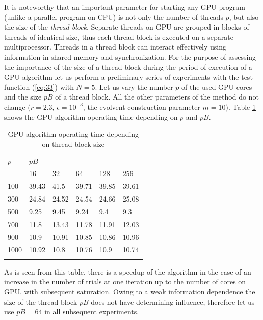 \documentclass[smallcondensed]{svjour3}     %
\begin{document}
It is noteworthy that an important parameter for starting any GPU program (unlike a parallel program on CPU) is not only the number of threads $p$, but also the size of the \textit{thread block}. Separate threads on GPU are grouped in blocks of threads of identical size, thus each thread block is executed on a separate multiprocessor. Threads in a thread block can interact effectively using information in shared memory and synchronization. For the purpose of assessing the importance of the size of a thread block during the period of execution of a GPU algorithm let us perform a preliminary series of experiments with the test function (\ref{eq:33}) with $N=5$. Let us vary the number $p$ of the used GPU cores and the size $pB$ of a thread block. All the other parameters of the method do not change ($r=2.3$, $\epsilon = 10^{-3}$, the evolvent construction parameter $m=10$). Table \ref{tab:2} shows the GPU algorithm operating time depending on $p$ and $pB$.
\begin{table}
	\caption{GPU algorithm operating time depending on thread block size}
	\label{tab:2}
	\center
	\begin{tabular}{llllll}
		\hline\noalign{\smallskip}
		$p$ & \multicolumn{5}{l}{ \hfil $pB$ \hfil } \\
		\noalign{\smallskip} \cline{2-6} \noalign{\smallskip}
		 & 16 & 32 & 64 & 128 & 256  \\
		\noalign{\smallskip} \hline \noalign{\smallskip}
		100 &	39.43 &	41.5 &	39.71 &	39.85 &	39.61 \\
		300 &	24.84 &	24.52 &	24.54 &	24.66 &	25.08 \\
		500 &	9.25 &	9.45 &	9.24 &	9.4 &	9.3\\
		700 &	11.8 &	13.43 &	11.78 &	11.91 &	12.03\\
		900 &	10.9 &	10.91 &	10.85 &	10.86 &	10.96\\
		1000 &	10.92 &	10.8 &	10.76 &	10.9 &	10.74\\
		\noalign{\smallskip}\hline
	\end{tabular}
\end{table}

As is seen from this table, there is a speedup of the algorithm in the case of an increase in the number of trials at one iteration up to the number of cores on GPU, with subsequent saturation. Owing to a weak information dependence the size of the thread block $pB$ does not have determining influence, therefore let us use $pB=64$ in all subsequent experiments.
\end{document}

